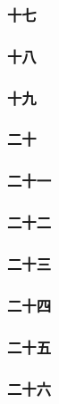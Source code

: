 \subsubsection*{十七}




\subsubsection*{十八}




\subsubsection*{十九}




\subsubsection*{二十}




\subsubsection*{二十一}




\subsubsection*{二十二}




\subsubsection*{二十三}




\subsubsection*{二十四}




\subsubsection*{二十五}




\subsubsection*{二十六}





